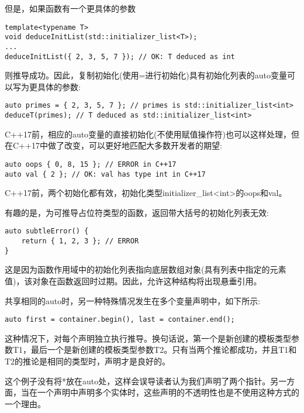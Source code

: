 但是，如果函数有一个更具体的参数

\begin{lstlisting}[style=styleCXX]
template<typename T>
void deduceInitList(std::initializer_list<T>);
...
deduceInitList({ 2, 3, 5, 7 }); // OK: T deduced as int
\end{lstlisting}

则推导成功。因此，复制初始化(使用=进行初始化)具有初始化列表的auto变量可以写为更具体的参数:

\begin{lstlisting}[style=styleCXX]
auto primes = { 2, 3, 5, 7 }; // primes is std::initializer_list<int>
deduceT(primes); // T deduced as std::initializer_list<int>
\end{lstlisting}

C++17前，相应的auto变量的直接初始化(不使用赋值操作符)也可以这样处理，但在C++17中做了改变，可以更好地匹配大多数开发者的期望:

\begin{lstlisting}[style=styleCXX]
auto oops { 0, 8, 15 }; // ERROR in C++17
auto val { 2 }; // OK: val has type int in C++17
\end{lstlisting}

C++17前，两个初始化都有效，初始化类型initializer\_list<int>的oops和val。

有趣的是，为可推导占位符类型的函数，返回带大括号的初始化列表无效:

\begin{lstlisting}[style=styleCXX]
auto subtleError() {
	return { 1, 2, 3 }; // ERROR
}
\end{lstlisting}

这是因为函数作用域中的初始化列表指向底层数组对象(具有列表中指定的元素值)，该对象在函数返回时过期。因此，允许这种结构将出现悬垂引用。

共享相同的auto时，另一种特殊情况发生在多个变量声明中，如下所示:

\begin{lstlisting}[style=styleCXX]
auto first = container.begin(), last = container.end();
\end{lstlisting}

这种情况下，对每个声明独立执行推导。换句话说，第一个是新创建的模板类型参数T1，最后一个是新创建的模板类型参数T2。只有当两个推论都成功，并且T1和T2的推论是相同的类型时，声明才是良好的。

\begin{tcolorbox}[colback=webgreen!5!white,colframe=webgreen!75!black]
\hspace*{0.75cm}这个例子没有将*放在auto处，这样会误导读者认为我们声明了两个指针。另一方面，当在一个声明中声明多个实体时，这些声明的不透明性也是不使用这种方式的一个理由。
\end{tcolorbox}


